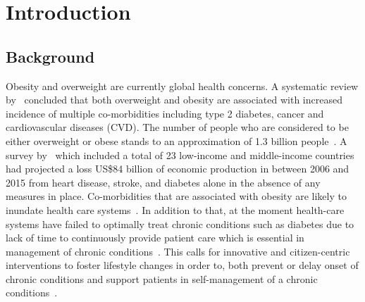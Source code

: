
\chapter{Introduction} %

\label{introductionchapter} %


\section{Background}
Obesity and overweight are currently global health concerns. A systematic review by~\cite{guh2009incidence} concluded that both overweight and obesity are associated with increased incidence of multiple co-morbidities including type 2 diabetes, cancer and cardiovascular diseases (CVD). The number of people who are considered to be either overweight or obese stands to an approximation of  1.3 billion people~\citep{steyn2006chronic}. A survey by~\cite{abegunde:theburden} which included a total of 23 low-income and middle-income countries had projected a loss US\$84 billion of economic production in between 2006 and 2015 from heart disease, stroke, and diabetes alone in the absence of any measures in place. Co-morbidities that are associated with obesity are likely to inundate health care systems~\citep{pollak2010s}. In addition to that, at the moment health-care systems have failed to optimally treat chronic conditions such as diabetes due to lack of time to continuously provide  patient  care which is essential in management of chronic conditions~\citep{quinn2008welldoc}. This calls for innovative and citizen-centric  interventions to foster lifestyle changes in order to, both prevent or delay onset of chronic conditions and support patients in self-management of a chronic conditions~\citep{korhonen2010personal,aarsand2012mobile,higgins2016smartphone}.

